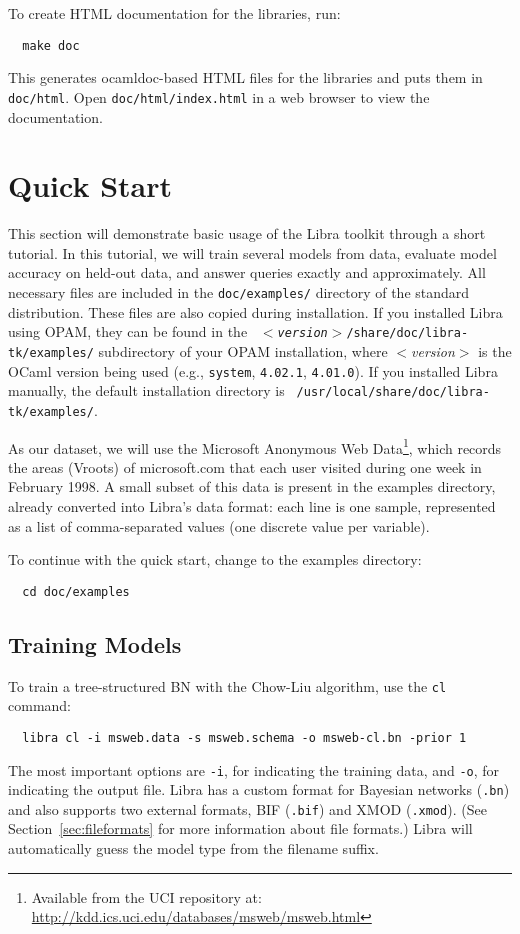 \documentclass[11pt]{article}
\begin{document}
To create HTML documentation for the libraries, run:
\begin{verbatim}
  make doc
\end{verbatim}
This generates ocamldoc-based HTML files for the libraries and puts them in {\tt doc/html}.  Open {\tt doc/html/index.html} in a web browser to view the documentation.

\section{Quick Start}

This section will demonstrate basic usage of the Libra toolkit through
a short tutorial.  In this tutorial, we will train several models from
data, evaluate model accuracy on held-out data, and answer queries
exactly and approximately.  All necessary files are included in the
{\tt doc/examples/} directory of the standard distribution.  These
files are also copied during installation.  If you installed Libra
using OPAM, they can be found in the {\tt {\em
$<$version$>$}/share/doc/libra-tk/examples/} subdirectory of your OPAM
installation, where {\em $<$version$>$} is the OCaml version being
used (e.g., {\tt system}, {\tt 4.02.1}, {\tt 4.01.0}).  If you
installed Libra manually, the default installation directory is {\tt
/usr/local/share/doc/libra-tk/examples/}.

As our dataset, we will use the Microsoft Anonymous Web
Data\footnote{Available from the UCI repository at:
\url{http://kdd.ics.uci.edu/databases/msweb/msweb.html}}, which records the
areas (Vroots) of microsoft.com that each user visited during one week
in February 1998.  A small subset of this data is present in the
examples directory, already converted into Libra's data format: each
line is one sample, represented as a list of comma-separated values
(one discrete value per variable).

To continue with the quick start, change to the examples directory:
\begin{verbatim}
  cd doc/examples
\end{verbatim}

\subsection{Training Models}

To train a tree-structured BN with the Chow-Liu algorithm, use the
{\tt cl} command:
\begin{verbatim}
  libra cl -i msweb.data -s msweb.schema -o msweb-cl.bn -prior 1
\end{verbatim}
The most important options are {\tt -i}, for indicating the training
data, and {\tt -o}, for indicating the output file.  Libra has a
custom format for Bayesian networks ({\tt .bn}) and also supports two
external formats, BIF ({\tt .bif}) and XMOD ({\tt .xmod}). (See
Section~\ref{sec:fileformats} for more information about file formats.)
Libra will automatically guess the model type from the
filename suffix.
\end{document}
